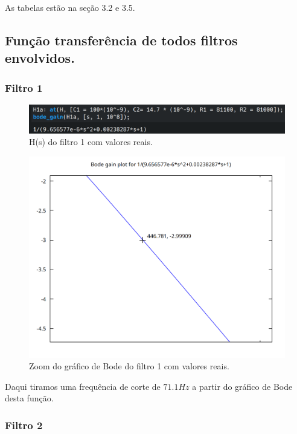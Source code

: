\documentclass[12pt,twoside, a4paper, twocolumn]{article}
\begin{document}
As tabelas estão na seção 3.2 e 3.5.


\subsection{Função transferência de todos filtros envolvidos.}


\subsubsection{Filtro 1}


\begin{figure}[h]
    \centering
    \includegraphics[width=1\columnwidth]{images/hsfiltro1.png}
    \caption{H(s) do filtro 1 com valores reais.}
\end{figure}


\begin{figure}[h]
    \centering
    \includegraphics[width=1\columnwidth]{images/zoomH1.png}
    \caption{Zoom do gráfico de Bode do filtro 1 com valores reais.}
\end{figure}


Daqui tiramos uma frequência de corte de $71.1Hz$ a partir do gráfico de Bode desta função.




\subsubsection{Filtro 2}
\end{document}
